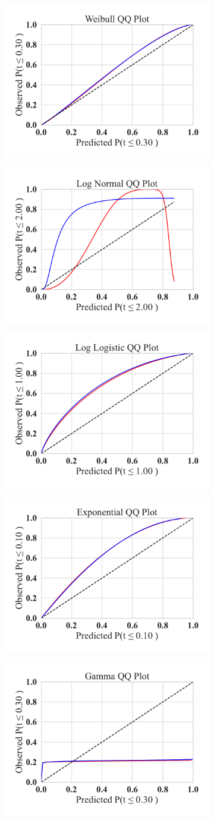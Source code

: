 \begin{figure}
	\centering
	\begin{subfigure}
		\centering
		\includegraphics[width=.30\textwidth,trim={20pt 20pt 20pt 20pt},clip]{plots/weibull_qq.pdf}
	\end{subfigure}%
	\begin{subfigure}
		\centering
		\includegraphics[width=.30\textwidth,trim={20pt 20pt 20pt 20pt},clip]{plots/log_normal_qq.pdf}
	\end{subfigure}
	\begin{subfigure}
		\centering
		\includegraphics[width=.30\textwidth,trim={20pt 20pt 20pt 20pt},clip]{plots/log_logistic_qq.pdf}
	\end{subfigure}
 \begin{subfigure}
		\centering
		\includegraphics[width=.30\textwidth,trim={20pt 20pt 20pt 20pt},clip]{plots/exponential_qq.pdf}
	\end{subfigure}%
	\begin{subfigure}
		\centering
		\includegraphics[width=.30\textwidth,trim={20pt 20pt 20pt 20pt},clip]{plots/gamma_qq.pdf}

\end{subfigure}
\end{figure}

